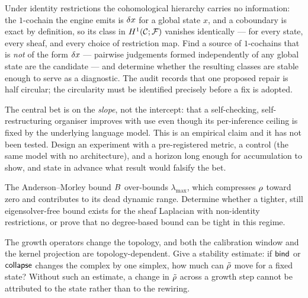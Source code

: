 \begin{openproblem}\label{op:H1}
Under identity restrictions the cohomological hierarchy carries no
information: the $1$-cochain the engine emits is $\delta x$ for a global
state $x$, and a coboundary is exact by definition, so its class in
$H^{1}(\mathcal{C};\mathcal{F})$ vanishes identically --- for every state, every sheaf, and every
choice of restriction map. Find a source of $1$-cochains that is
\emph{not} of the form $\delta x$ --- pairwise judgements formed
independently of any global state are the candidate --- and determine
whether the resulting classes are stable enough to serve as a diagnostic.
The audit records that one proposed repair is half circular; the
circularity must be identified precisely before a fix is adopted.
\end{openproblem}

\begin{openproblem}\label{op:slope}
The central bet is on the \emph{slope}, not the intercept: that a
self-checking, self-restructuring organiser improves with use even though
its per-inference ceiling is fixed by the underlying language model.
This is an empirical claim and it has not been tested. Design an
experiment with a pre-registered metric, a control (the same model with
no architecture), and a horizon long enough for accumulation to show, and
state in advance what result would falsify the bet.
\end{openproblem}

\begin{openproblem}\label{op:normaliser}
The Anderson--Morley bound $B$ over-bounds $\lambda_{\max}$, which
compresses $\rho$ toward zero and contributes to its dead dynamic
range. Determine whether a tighter, still eigensolver-free bound exists
for the sheaf Laplacian with non-identity restrictions, or prove that no
degree-based bound can be tight in this regime.
\end{openproblem}

\begin{openproblem}\label{op:stability}
The growth operators change the topology, and both the calibration
window and the kernel projection are topology-dependent. Give a
stability estimate: if $\mathsf{bind}$ or $\mathsf{collapse}$ changes the complex by
one simplex, how much can $\tilde{\rho}$ move for a fixed state? Without such
an estimate, a change in $\tilde{\rho}$ across a growth step cannot be
attributed to the state rather than to the rewiring.
\end{openproblem}

